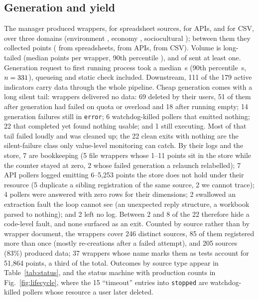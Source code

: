 \documentclass[conference]{IEEEtran}
\begin{document}
\subsection{Generation and yield}
\label{sec:res-gen}
The manager produced \nWrappers{} wrappers, \nXLSX{} for spreadsheet sources,
\nAPI{} for APIs, and \nCSV{} for CSV, over three domains (environment
\nDomAmbiente{}, economy \nDomEconomia{}, sociocultural \nDomSocio{}); between them
they collected \nDataPoints{} points (\nDataPointsXLSX{} from spreadsheets,
\nDataPointsAPI{} from APIs, \nDataPointsCSV{} from CSV). Volume is long-tailed (median \medianPointsPerWrapper{} points per wrapper, 90th
percentile \pNinetyPointsPerWrapper{}), and \nNonzeroPointWrappers{} of \nWrappers{}
sent at least one. Generation request to first running process took a median \genLatencyMedian{}\,s
(90th percentile \genLatencyPninety{}\,s, $n=331{}$), queueing and
static check included. Downstream, 111 of the 179 active indicators carry data through the whole pipeline. Cheap generation comes with
a long silent tail: \nZeroPointWrappers{} wrappers delivered no data: 69 deleted by their users, 51 of
them after generation had failed on quota or overload and 18 after running empty; 14
generation failures still in \texttt{error}; 6 watchdog-killed pollers that emitted
nothing; 22 that completed yet found nothing usable; and 1 still executing. Most of
that tail failed loudly and was cleaned up; the 22 clean exits with nothing are the
silent-failure class only value-level monitoring can catch. By their logs and the
store, 7 are bookkeeping (5 file wrappers whose 1--11 points
sit in the store while the counter stayed at zero, 2 whose failed generation a
relaunch relabelled); 7 API pollers logged emitting 6--5{,}253 points the store does
not hold under their resource (5 duplicate a sibling registration of the same
source, 2 we cannot trace); 4 pollers were answered with zero rows for their
dimensions; 2 swallowed an extraction fault the loop cannot see (an unexpected reply
structure, a workbook parsed to nothing); and 2 left no log. Between 2 and 8 of the
22 therefore hide a code-level fault, and none surfaced as an exit. Counted by source rather than by wrapper document, the \nWrappers{} wrappers
cover 246 distinct sources, 85 of them registered more than once (mostly re-creations
after a failed attempt), and 205 sources (83\%) produced data; 37 wrappers whose name
marks them as tests account for 51{,}864 points, a third of the total. Outcomes by source type appear in Table~\ref{tab:status}, and the status machine
with production counts in Fig.~\ref{fig:lifecycle}, where the 15 ``timeout'' entries
into \texttt{stopped} are watchdog-killed pollers whose resource a user later deleted.
\end{document}
